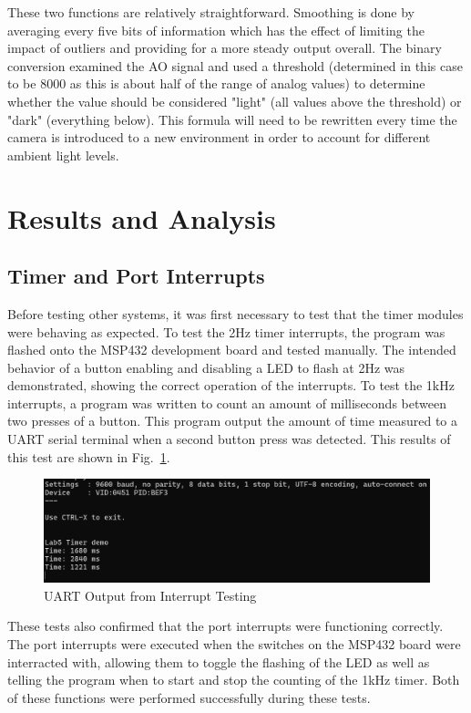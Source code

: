 \documentclass[conference]{IEEEtran}
\begin{document}
These two functions are relatively straightforward. Smoothing is done by averaging every five bits of information which has the effect of limiting the impact of outliers and providing for a more steady output overall. The binary conversion examined the AO signal and used a threshold (determined in this case to be 8000 as this is about half of the range of analog values) to determine whether the value should be considered "light" (all values above the threshold) or "dark" (everything below). This formula will need to be rewritten every time the camera is introduced to a new environment in order to account for different ambient light levels.

\section{Results and Analysis}

\subsection{Timer and Port Interrupts}

Before testing other systems, it was first necessary to test that the timer
modules were behaving as expected. To test the 2Hz timer interrupts, the
program was flashed onto the MSP432 development board and tested manually.
The intended behavior of a button enabling and disabling a LED to flash at
2Hz was demonstrated, showing the correct operation of the interrupts. To
test the 1kHz interrupts, a program was written to count an amount of
milliseconds between two presses of a button. This program output the amount
of time measured to a UART serial terminal when a second button press was
detected. This results of this test are shown in Fig.~\ref{part1terminal}.

\begin{figure}
    \centering
    \includegraphics[width=\linewidth,decodearray={1 0 1 0 1 0}]{images/part1terminal.png}
    \caption{UART Output from Interrupt Testing}
    \label{part1terminal}
\end{figure}

These tests also confirmed that the port interrupts were functioning
correctly. The port interrupts were executed when the switches on the
MSP432 board were interracted with, allowing them to toggle the flashing
of the LED as well as telling the program when to start and stop the
counting of the 1kHz timer. Both of these functions were performed
successfully during these tests.
\end{document}
